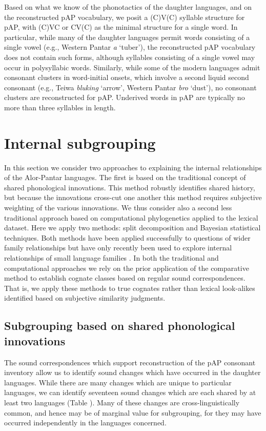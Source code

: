 Based on what we know of the phonotactics of the daughter languages, and on the reconstructed pAP vocabulary, we posit a (C)V(C) syllable structure for pAP, with (C)VC or CV(C) as the minimal structure for a single word. In particular, while many of the daughter languages permit words consisting of a single vowel (e.g., Western Pantar \textit{a }`tuber'), the reconstructed pAP vocabulary does not contain such forms, although syllables consisting of a single vowel may occur in polysyllabic words. Similarly, while some of the modern languages admit consonant clusters in word-initial onsets, which involve a second liquid second consonant (e.g., Teiwa \textit{bluking} `arrow', Western Pantar \textit{bro} `dust'), no consonant clusters are reconstructed for pAP. Underived words in pAP are typically no more than three syllables in length.

\section{Internal subgrouping }
In this section we consider two approaches to explaining the internal relationships of the Alor-Pantar languages. The first is based on the traditional concept of shared phonological innovations. This method robustly identifies shared history, but because the innovations cross-cut one another this method requires subjective weighting of the various innovations. We thus consider also a second less traditional approach based on computational phylogenetics applied to the lexical dataset. Here we apply two methods: split decomposition and Bayesian statistical techniques. Both methods have been applied successfully to questions of wider family relationships but have only recently been used to explore internal relationships of small language families \citep[e.g.][]{DunnEtAl2011}. In both the traditional and computational approaches we rely on the prior application of the comparative method to establish cognate classes based on regular sound correspondences. That is, we apply these methods to true cognates rather than
lexical look-alikes identified based on subjective similarity judgments.

\subsection{ Subgrouping based on shared phonological innovations}
The sound correspondences which support reconstruction of the pAP consonant inventory allow us to identify sound changes which have occurred in the daughter languages. While there are many changes which are unique to particular languages, we can identify seventeen sound changes which are each shared by at least two languages (Table ). Many of these changes are cross-linguistically common, and hence may be of marginal value for subgrouping, for they may have occurred independently in the languages concerned.




